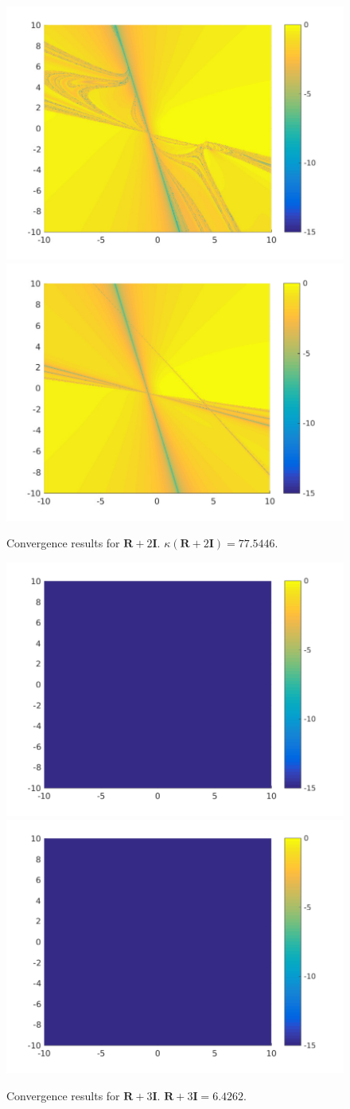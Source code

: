 \begin{frame}
\begin{figure}
\centering
\includegraphics[width=0.45\linewidth]{../images/randAp2eyeGMRES1}
\includegraphics[width=0.45\linewidth]{../images/randAp2eyeGMRES2}
\caption{Convergence results for $\mathbf{R} + 2\mathbf{I}$. $\kappa(\mathbf{R} + 2\mathbf{I}) = 77.5446$. }
\label{fig:randAp2eyeGMRES2}
\end{figure}
\end{frame}
\begin{frame}
\begin{figure}
\centering
\includegraphics[width=0.45\linewidth]{../images/randAp3eyeGMRES2}
\includegraphics[width=0.45\linewidth]{../images/randAp3eyeGMRES2}
\caption{Convergence results for $\mathbf{R} + 3\mathbf{I}$. $\mathbf{R} + 3\mathbf{I} = 6.4262$.}
\label{fig:randAp3eyeGMRES2}
\end{figure}
\end{frame}


